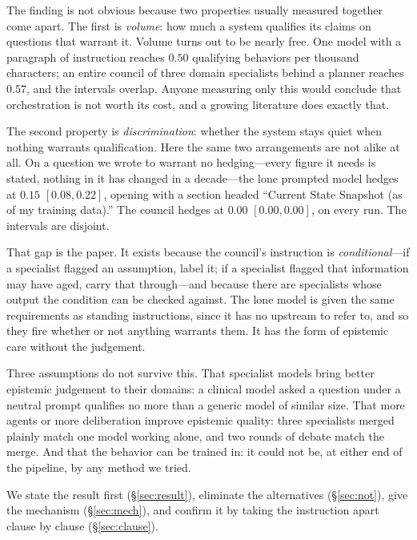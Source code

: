 \documentclass[11pt]{article}
\begin{document}
The finding is not obvious because two properties usually measured together
come apart. The first is \emph{volume}: how much a system qualifies its claims
on questions that warrant it. Volume turns out to be nearly free. One model
with a paragraph of instruction reaches $0.50$ qualifying behaviors per
thousand characters; an entire council of three domain specialists behind a
planner reaches $0.57$, and the intervals overlap. Anyone measuring only this
would conclude that orchestration is not worth its cost, and a growing
literature does exactly that.

The second property is \emph{discrimination}: whether the system stays quiet
when nothing warrants qualification. Here the same two arrangements are not
alike at all. On a question we wrote to warrant no hedging---every figure it
needs is stated, nothing in it has changed in a decade---the lone prompted
model hedges at $0.15$ $[0.08,0.22]$, opening with a section headed ``Current
State Snapshot (as of my training data).'' The council hedges at $0.00$
$[0.00,0.00]$, on every run. The intervals are disjoint.

That gap is the paper. It exists because the council's instruction is
\emph{conditional}---if a specialist flagged an assumption, label it; if a
specialist flagged that information may have aged, carry that through---and
because there are specialists whose output the condition can be checked
against. The lone model is given the same requirements as standing
instructions, since it has no upstream to refer to, and so they fire whether
or not anything warrants them. It has the form of epistemic care without the
judgement.

Three assumptions do not survive this. That specialist models bring better
epistemic judgement to their domains: a clinical model asked a question under
a neutral prompt qualifies no more than a generic model of similar size. That
more agents or more deliberation improve epistemic quality: three specialists
merged plainly match one model working alone, and two rounds of debate match
the merge. And that the behavior can be trained in: it could not be, at either
end of the pipeline, by any method we tried.

We state the result first (\S\ref{sec:result}), eliminate the alternatives
(\S\ref{sec:not}), give the mechanism (\S\ref{sec:mech}), and confirm it by
taking the instruction apart clause by clause (\S\ref{sec:clause}).
\end{document}
